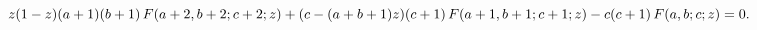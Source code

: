 \[{z(1-z)(a+1)(b+1)}\mathop{F\/}\nolimits\!\left(a+2,b+2;c+2;z\right)+{(c-(a+b+1%
)z)(c+1)}\mathop{F\/}\nolimits\!\left(a+1,b+1;c+1;z\right)-{c(c+1)}\mathop{F\/%
}\nolimits\!\left(a,b;c;z\right)=0.\]